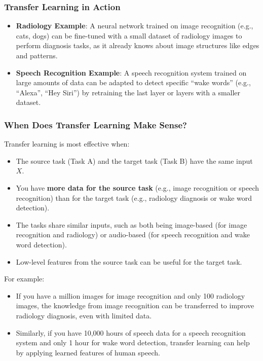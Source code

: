 \documentclass[letterpaper,12pt,notitlepage,twoside]{report}
\begin{document}
\subsubsection*{Transfer Learning in Action}
\begin{itemize}
    \item \textbf{Radiology Example}: A neural network trained on image recognition (e.g., cats, dogs) can be fine-tuned with a small dataset of radiology images to perform diagnosis tasks, as it already knows about image structures like edges and patterns.
    \item \textbf{Speech Recognition Example}: A speech recognition system trained on large amounts of data can be adapted to detect specific ``wake words'' (e.g., ``Alexa'', ``Hey Siri'') by retraining the last layer or layers with a smaller dataset.
\end{itemize}

\subsubsection*{When Does Transfer Learning Make Sense?}
Transfer learning is most effective when:
\begin{itemize}[nosep]
    \item The source task (Task A) and the target task (Task B) have the same input $X$.
    \item You have \textbf{more data for the source task} (e.g., image recognition or speech recognition) than for the target task (e.g., radiology diagnosis or wake word detection).
    \item The tasks share similar inputs, such as both being image-based (for image recognition and radiology) or audio-based (for speech recognition and wake word detection).
    \item Low-level features from the source task can be useful for the target task.
\end{itemize}

For example:
\begin{itemize}[nosep]
    \item If you have a million images for image recognition and only 100 radiology images, the knowledge from image recognition can be transferred to improve radiology diagnosis, even with limited data.
    \item Similarly, if you have 10,000 hours of speech data for a speech recognition system and only 1 hour for wake word detection, transfer learning can help by applying learned features of human speech.
\end{itemize}
\end{document}
